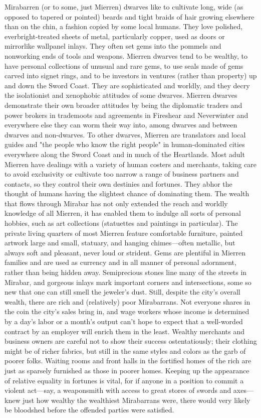 \documentclass[10pt,a4paper,twoside,twocolumn,openany,bg=print,nodeprecatedcode]{dndbook}
\begin{document}
Mirabarren (or to some, just Mierren) dwarves like to cultivate long, wide (as opposed to tapered or pointed) beards and tight braids of hair growing elsewhere than on the chin, a fashion copied by some local humans. They love polished, everbright-treated sheets of metal, particularly copper, used as doors or mirrorlike wallpanel inlays. They often set gems into the pommels and nonworking ends of tools and weapons. Mierren dwarves tend to be wealthy, to have personal collections of unusual and rare gems, to use seals made of gems carved into signet rings, and to be investors in ventures (rather than property) up and down the Sword Coast. They are sophisticated and worldly, and they decry the isolationist and xenophobic attitudes of some dwarves. Mierren dwarves demonstrate their own broader attitudes by being the diplomatic traders and power brokers in trademoots and agreements in Fireshear and Neverwinter and everywhere else they can worm their way into, among dwarves and between dwarves and non-dwarves.
To other dwarves, Mierren are translators and local guides and "the people who know the right people" in human-dominated cities everywhere along the Sword Coast and in much of the Heartlands. Most adult Mierren have dealings with a variety of human costers and merchants, taking care to avoid exclusivity or cultivate too narrow a range of business partners and contacts, so they control their own destinies and fortunes. They abhor the thought of humans having the slightest chance of dominating them.
The wealth that flows through Mirabar has not only extended the reach and worldly knowledge of all Mierren, it has enabled them to indulge all sorts of personal hobbies, such as art collections (statuettes and paintings in particular). The private living quarters of most Mierren feature comfortable furniture, painted artwork large and small, statuary, and hanging chimes—often metallic, but always soft and pleasant, never loud or strident. Gems are plentiful in Mierren families and are used as currency and in all manner of personal adornment, rather than being hidden away. Semiprecious stones line many of the streets in Mirabar, and gorgeous inlays mark important corners and intersections, some so new that one can still smell the jeweler's dust.
Still, despite the city's overall wealth, there are rich and (relatively) poor Mirabarrans. Not everyone shares in the coin the city's sales bring in, and wage workers whose income is determined by a day's labor or a month's output can't hope to expect that a well-worded contract by an employer will enrich them in the least. Wealthy merchants and business owners are careful not to show their success ostentatiously; their clothing might be of richer fabrics, but still in the same styles and colors as the garb of poorer folks. Waiting rooms and front halls in the fortified homes of the rich are just as sparsely furnished as those in poorer homes. Keeping up the appearance of relative equality in fortunes is vital, for if anyone in a position to commit a violent act—say, a weaponsmith with access to great stores of swords and axes—knew just how wealthy the wealthiest Mirabarrans were, there would very likely be bloodshed before the offended parties were satisfied.
\end{document}
